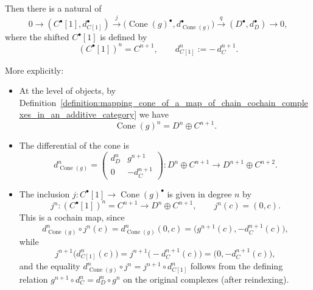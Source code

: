 \begin{lemma}
\begin{enumerate}
        Then there is a natural  of 
        \[
        0 \longrightarrow (C^\bullet[1], d_{C[1]}^\bullet)
        \xrightarrow{j}
        \bigl(\operatorname{Cone}(g)^\bullet, d_{\operatorname{Cone}(g)}^\bullet\bigr)
        \xrightarrow{q}
        (D^\bullet, d_D^\bullet)
        \longrightarrow 0,
        \]
        where the shifted  $C^\bullet[1]$ is defined by
        \[
            (C^\bullet[1])^n = C^{n+1}, \qquad
            d_{C[1]}^n := -\,d_C^{n+1}.
        \]

        More explicitly:

        \begin{itemize}
        \item At the level of objects, by
        Definition~\ref{definition:mapping_cone_of_a_map_of_chain_cochain_complexes_in_an_additive_category}
        we have
        \[
            \operatorname{Cone}(g)^n = D^n \oplus C^{n+1}.
        \]

        \item The differential of the cone is
        \[
        d_{\operatorname{Cone}(g)}^n
        =
        \begin{pmatrix}
        d_D^n & g^{n+1} \\
        0     & -d_C^{n+1}
        \end{pmatrix}
        : D^n \oplus C^{n+1} \longrightarrow D^{n+1} \oplus C^{n+2}.
        \]

        \item The inclusion $j : C^\bullet[1] \to \operatorname{Cone}(g)^\bullet$ is given in degree $n$ by
        \[
            j^n : (C^\bullet[1])^n = C^{n+1} \longrightarrow D^n \oplus C^{n+1}, \qquad
            j^n(c) = (0, c).
        \]
        This is a cochain map, since
        \[
            d_{\operatorname{Cone}(g)}^n \circ j^n(c)
            =
            d_{\operatorname{Cone}(g)}^n(0,c)
            =
            \bigl(g^{n+1}(c), -d_C^{n+1}(c)\bigr),
        \]
        while
        \[
            j^{n+1}\bigl(d_{C[1]}^n(c)\bigr)
            =
            j^{n+1}\bigl(-d_C^{n+1}(c)\bigr)
            =
            \bigl(0, -d_C^{n+1}(c)\bigr),
        \]
        and the equality
        \(
        d_{\operatorname{Cone}(g)}^n \circ j^n
        =
        j^{n+1} \circ d_{C[1]}^n
        \)
        follows from the defining relation
        \(g^{n+1}\circ d_C^{n} = d_D^{n}\circ g^{n}\) on the original complexes (after reindexing).


\end{itemize}
\end{enumerate}
\end{lemma}
